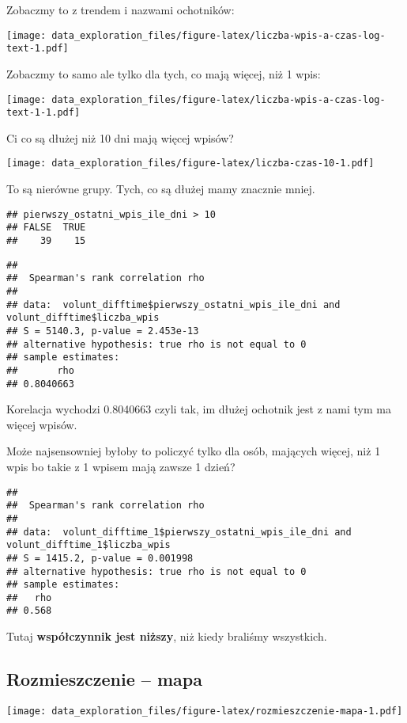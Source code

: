\documentclass[
]{article}
\begin{document}
Zobaczmy to z trendem i nazwami ochotników:

\texttt{[image: data\_exploration\_files/figure-latex/liczba-wpis-a-czas-log-text-1.pdf]}

Zobaczmy to samo ale tylko dla tych, co mają więcej, niż 1 wpis:

\texttt{[image: data\_exploration\_files/figure-latex/liczba-wpis-a-czas-log-text-1-1.pdf]}

Ci co są dłużej niż 10 dni mają więcej wpisów?

\texttt{[image: data\_exploration\_files/figure-latex/liczba-czas-10-1.pdf]}

To są nierówne grupy. Tych, co są dłużej mamy znacznie mniej.

\begin{verbatim}
## pierwszy_ostatni_wpis_ile_dni > 10
## FALSE  TRUE 
##    39    15
\end{verbatim}

\begin{verbatim}
## 
##  Spearman's rank correlation rho
## 
## data:  volunt_difftime$pierwszy_ostatni_wpis_ile_dni and volunt_difftime$liczba_wpis
## S = 5140.3, p-value = 2.453e-13
## alternative hypothesis: true rho is not equal to 0
## sample estimates:
##       rho 
## 0.8040663
\end{verbatim}

Korelacja wychodzi 0.8040663 czyli tak, im dłużej ochotnik jest z nami
tym ma więcej wpisów.

Może najsensowniej byłoby to policzyć tylko dla osób, mających więcej,
niż 1 wpis bo takie z 1 wpisem mają zawsze 1 dzień?

\begin{verbatim}
## 
##  Spearman's rank correlation rho
## 
## data:  volunt_difftime_1$pierwszy_ostatni_wpis_ile_dni and volunt_difftime_1$liczba_wpis
## S = 1415.2, p-value = 0.001998
## alternative hypothesis: true rho is not equal to 0
## sample estimates:
##   rho 
## 0.568
\end{verbatim}

Tutaj \textbf{współczynnik jest niższy}, niż kiedy braliśmy wszystkich.

\hypertarget{rozmieszczenie-mapa}{%
\subsection{Rozmieszczenie -- mapa}\label{rozmieszczenie-mapa}}

\texttt{[image: data\_exploration\_files/figure-latex/rozmieszczenie-mapa-1.pdf]}
\end{document}
